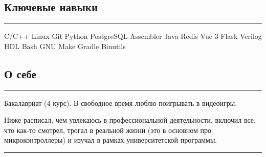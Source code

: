 \documentclass[10pt, final, twoside]{article}
\newcommand{\skill}[1]{\colorbox{darkgray4}{\textcolor{darkgray2}{#1}}}
\begin{document}
  \subsection*{\textcolor{darkgray2}{Ключевые навыки}}
  \vspace*{-5.5mm}
  \par\noindent\rule{\textwidth}{0.1pt}
    \skill{C/C++} \skill{Linux} \skill{Git} \skill{Python} \skill{PostgreSQL} \skill{Assembler} \skill{Java} \skill{Redis} \skill{Vue 3} \skill{Flask} \skill{Verilog HDL} \skill{Bash} \skill{GNU Make} \skill{Gradle} \skill{Binutils}
    
  \subsection*{\textcolor{darkgray2}{О себе}}
  \vspace*{-5.5mm}
  \par\noindent\rule{\textwidth}{0.1pt}
  
Бакалавриат (4 курс). В свободное время люблю поигрывать в видеоигры.

Ниже расписал, чем увлекаюсь в профессиональной деятельности, включил все, что как-то смотрел, трогал в реальной жизни (это в основном про микроконтроллеры) и изучал в рамках университетской программы.

\par\noindent\rule{\textwidth}{0.1pt}
\end{document}
